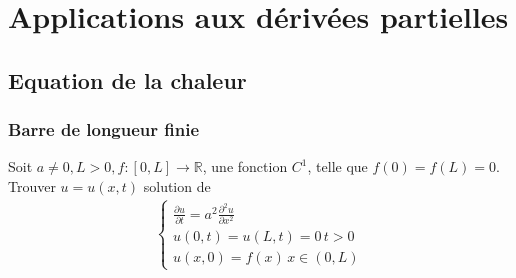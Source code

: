 \chapter[Applications: PDE]{Applications aux dérivées partielles}
\section{Equation de la chaleur}
\subsection{Barre de longueur finie}
Soit $a\neq0,L>0, f:[0,L]\rightarrow\mathbb R$, une fonction $C^1$, telle que $f(0)=f(L)=0$. Trouver $u=u(x,t)$ solution de 
\begin{eqnarray}
	\label{eq:18.1}
	\begin{cases}
		\frac{\partial u}{\partial t}=a^2\frac{\partial^2 u}{\partial x^2}
		\\
		u(0,t)=u(L,t)=0 \,t>0
		\\
		u(x,0)=f(x) \,x\in(0,L)
	\end{cases}
\end{eqnarray}

